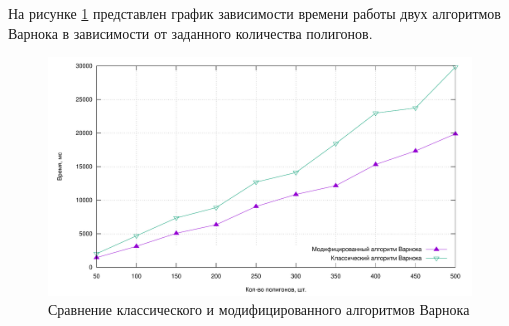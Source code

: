 \begin{table}[H]
    \caption{\label{tbl:time}Замеры времени сравнения алгоритмов Варнока}
\end{table}

На рисунке \ref{img:plot} представлен график зависимости времени работы двух алгоритмов Варнока в зависимости от заданного количества полигонов.

\begin{figure}[H]
	\centering
	\includegraphics[height=0.35\textheight]{inc/img/plot.pdf}
	\caption{Сравнение классического и модифицированного алгоритмов Варнока}
	\label{img:plot}
\end{figure}

